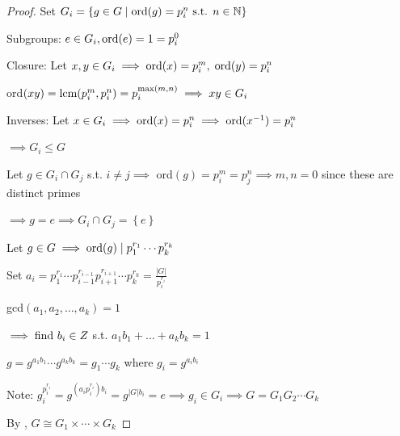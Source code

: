 \begin{proof}
    Set $G_i=\left\{ g\in G \mid \text{ord}(g)=p_i^n \text{ s.t. } n\in\mathbb{N}\right\}$

    Subgroups: $e\in G_i, \text{ord}(e)=1=p_i^0$

    Closure: Let $x,y \in G_i \implies \text{ord}(x)=p_i^m,\; \text{ord}(y)=p_i^n$

    ord$(xy)=\text{lcm}(p_i^m,p_i^n)=p_i^{\text{max}(m,n)} \implies xy \in G_i$

    Inverses: Let $x\in G_i \implies \text{ord}(x)=p_i^n \implies \text{ord}(x^{-1})=p_i^n$

    $\implies G_i \leq G$

    Let $g\in G_i \cap G_j$ s.t. $i \neq j \implies$
    ord$(g)=p_i^m=p_j^n \implies m,n=0$ since these are distinct primes
    
    $\implies g=e \implies G_i\cap G_j = \left\{ e \right\}$

    Let $g\in G \implies \text{ord}(g) \mid p_1^{r_1}\cdots p_k^{r_k}$

    Set $a_i=p_1^{r_1}\cdots p_{i-1}^{r_{i-1}}
    p_{i+1}^{r_{i+1}}\cdots p_k^{r_k}=\frac{|G|}{p_i^{r_i}}$

    gcd$(a_1,a_2,\dots,a_k)=1$

    $\implies \text{find } b_i \in Z$ s.t. $a_1b_1+\dots+a_kb_k=1$

    $g=g^{a_1b_1}\cdots g^{a_kb_k}=g_1\cdots g_k$ where $g_i=g^{a_ib_i}$

    Note: $g_i^{p_i^{r_i}}=g^{(a_ip_i^{r_i})b_i}=g^{|G|b_i}=e \implies g_i \in G_i \implies G=G_1G_2\cdots G_k$

    By , $G \cong G_1 \times \cdots \times G_k$
\end{proof}
\newpage
{}

